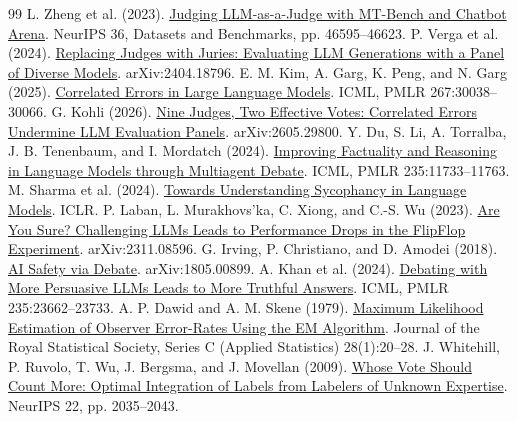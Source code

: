\documentclass[11pt,letterpaper]{article}
\begin{document}
\clearpage
\begingroup
\small
\setlength{\parskip}{0pt}
\begin{thebibliography}{99}
\setlength{\itemsep}{3pt}
 L. Zheng et al. (2023). \href{https://proceedings.neurips.cc/paper_files/paper/2023/hash/91f18a1287b398d378ef22505bf41832-Abstract.html}{Judging LLM-as-a-Judge with MT-Bench and Chatbot Arena}. NeurIPS 36, Datasets and Benchmarks, pp. 46595--46623.
 P. Verga et al. (2024). \href{https://arxiv.org/abs/2404.18796}{Replacing Judges with Juries: Evaluating LLM Generations with a Panel of Diverse Models}. arXiv:2404.18796.
 E. M. Kim, A. Garg, K. Peng, and N. Garg (2025). \href{https://proceedings.mlr.press/v267/kim25e.html}{Correlated Errors in Large Language Models}. ICML, PMLR 267:30038--30066.
 G. Kohli (2026). \href{https://arxiv.org/abs/2605.29800}{Nine Judges, Two Effective Votes: Correlated Errors Undermine LLM Evaluation Panels}. arXiv:2605.29800.
 Y. Du, S. Li, A. Torralba, J. B. Tenenbaum, and I. Mordatch (2024). \href{https://proceedings.mlr.press/v235/du24e.html}{Improving Factuality and Reasoning in Language Models through Multiagent Debate}. ICML, PMLR 235:11733--11763.
 M. Sharma et al. (2024). \href{https://proceedings.iclr.cc/paper_files/paper/2024/hash/0105f7972202c1d4fb817da9f21a9663-Abstract-Conference.html}{Towards Understanding Sycophancy in Language Models}. ICLR.
 P. Laban, L. Murakhovs'ka, C. Xiong, and C.-S. Wu (2023). \href{https://arxiv.org/abs/2311.08596}{Are You Sure? Challenging LLMs Leads to Performance Drops in the FlipFlop Experiment}. arXiv:2311.08596.
 G. Irving, P. Christiano, and D. Amodei (2018). \href{https://arxiv.org/abs/1805.00899}{AI Safety via Debate}. arXiv:1805.00899.
 A. Khan et al. (2024). \href{https://proceedings.mlr.press/v235/khan24a.html}{Debating with More Persuasive LLMs Leads to More Truthful Answers}. ICML, PMLR 235:23662--23733.
 A. P. Dawid and A. M. Skene (1979). \href{https://doi.org/10.2307/2346806}{Maximum Likelihood Estimation of Observer Error-Rates Using the EM Algorithm}. Journal of the Royal Statistical Society, Series C (Applied Statistics) 28(1):20--28.
 J. Whitehill, P. Ruvolo, T. Wu, J. Bergsma, and J. Movellan (2009). \href{https://proceedings.neurips.cc/paper/2009/hash/f899139df5e1059396431415e770c6dd-Abstract.html}{Whose Vote Should Count More: Optimal Integration of Labels from Labelers of Unknown Expertise}. NeurIPS 22, pp. 2035--2043.

\end{thebibliography}
\end{document}
